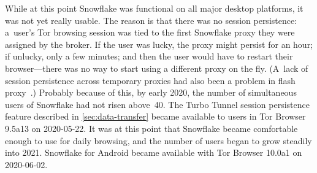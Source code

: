 \documentclass[letterpaper,twocolumn]{article}
\begin{document}
While at this point Snowflake was functional on all major desktop platforms,
it was not yet really usable.
The reason is that there was no session persistence:
a~user's Tor browsing session was tied to the first Snowflake proxy they were assigned by the broker.
If the user was lucky, the proxy might persist for an hour;
if unlucky, only a few minutes;
and then the user would have to restart their browser---there was
no way to start using a different proxy on the fly.
(A~lack of session persistence across temporary proxies
had also been a problem in flash proxy~\cite[\S 5.2]{Fifield2012a}.)
Probably because of this, by early 2020,
the number of simultaneous users of Snowflake
had not risen above~40.
%
%
The Turbo Tunnel session persistence feature
described in \autoref{sec:data-transfer}
became available to users in Tor Browser 9.5a13
on \mbox{2020-05-22}.
It was at this point that Snowflake became
comfortable enough to use for daily browsing,
and the number of users began to grow steadily into 2021.
Snowflake for Android became available with
Tor Browser 10.0a1 on \mbox{2020-06-02}.
\end{document}

